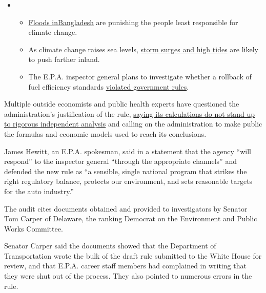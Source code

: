 \begin{itemize}
\item
  \begin{itemize}
  \tightlist
  \item
    \href{https://www.nytimes3xbfgragh.onion/2020/07/30/climate/bangladesh-floods.html?action=click\&pgtype=Article\&state=default\&region=MAIN_CONTENT_1\&context=storylines_keepup}{Floods
    in}\href{https://www.nytimes3xbfgragh.onion/2020/07/30/climate/bangladesh-floods.html?action=click\&pgtype=Article\&state=default\&region=MAIN_CONTENT_1\&context=storylines_keepup}{Bangladesh}
    are punishing the people least responsible for climate change.
  \item
    As climate change raises sea levels,
    \href{https://www.nytimes3xbfgragh.onion/2020/07/30/climate/sea-level-inland-floods.html?action=click\&pgtype=Article\&state=default\&region=MAIN_CONTENT_1\&context=storylines_keepup}{storm
    surges and high tides} are likely to push farther inland.
  \item
    The E.P.A. inspector general plans to investigate whether a rollback
    of fuel efficiency standards
    \href{https://www.nytimes3xbfgragh.onion/2020/07/27/climate/trump-fuel-efficiency-rule.html?action=click\&pgtype=Article\&state=default\&region=MAIN_CONTENT_1\&context=storylines_keepup}{violated
    government rules}.
  \end{itemize}
\end{itemize}

Multiple outside economists and public health experts have questioned
the administration's justification of the rule,
\href{https://www.nytimes3xbfgragh.onion/2020/03/31/climate/trump-pollution-rollback.html}{saying
its calculations do not stand up to rigorous independent analysis} and
calling on the administration to make public the formulas and economic
models used to reach its conclusions.

James Hewitt, an E.P.A. spokesman, said in a statement that the agency
``will respond'' to the inspector general ``through the appropriate
channels'' and defended the new rule as ``a sensible, single national
program that strikes the right regulatory balance, protects our
environment, and sets reasonable targets for the auto industry.''

The audit cites documents obtained and provided to investigators by
Senator Tom Carper of Delaware, the ranking Democrat on the Environment
and Public Works Committee.

Senator Carper said the documents showed that the Department of
Transportation wrote the bulk of the draft rule submitted to the White
House for review, and that E.P.A. career staff members had complained in
writing that they were shut out of the process. They also pointed to
numerous errors in the rule.


